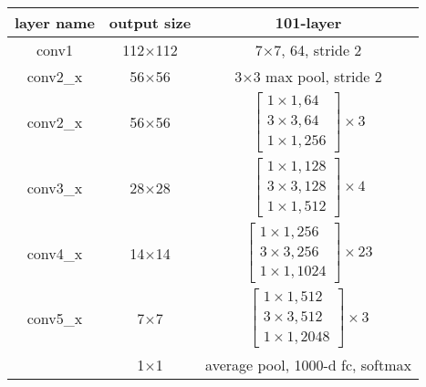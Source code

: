 \begin{itemize}
\begin{table}[!htbp]
\begin{tabular}{c|c|c|c|c}
         layer name& output size &\multicolumn{3}{c}{101-layer} \\
        \hline
         conv1 & 112$\times$112 & \multicolumn{3}{c}{7$\times$7, 64, stride 2}\\
         \hline
         conv2\_x & 56$\times$56 & \multicolumn{3}{c}{3$\times$3 max pool, stride 2} \\
         \hline
         conv2\_x & 56$\times$56 & \multicolumn{3}{c}{$\left[ \begin{array}{c}{1 \times 1,64} \\ {3 \times 3,64} \\ {1 \times 1,256}\end{array}\right] \times 3$}\\    
         \hline
        conv3\_x & 28$\times$28 & \multicolumn{3}{c}{$\left[ \begin{array}{c}{1 \times 1,128} \\ {3 \times 3,128} \\ {1 \times 1,512}\end{array}\right] \times 4$}\\
        \hline
        conv4\_x & 14$\times$14 & \multicolumn{3}{c}{$\left[ \begin{array}{c}{1 \times 1,256} \\ {3 \times 3,256} \\ {1 \times 1,1024}\end{array}\right] \times 23$}\\
        \hline
        conv5\_x & 7$\times$7 & \multicolumn{3}{c}{$\left[ \begin{array}{c}{1 \times 1,512} \\ {3 \times 3,512} \\ {1 \times 1,2048}\end{array}\right] \times 3$}\\
        \hline
        & 1$\times$1 &\multicolumn{3}{c}{average pool, 1000-d fc, softmax} \\
        \hline
    \end{tabular}
\end{table}

\begin{comment}
\begin{table}[!htbp]
    \bicaption{Resnet101参数配置\cite{8he2016deep}}{The config of Resnet101\cite{8he2016deep}}
    \label{tab:stage2_resmodel}
    \centering
    \footnotesize%
    \setlength{\tabcolsep}{4pt}%
    \begin{tabular}{c|c|c|c|c}
        \hline
        

\end{comment}
\end{itemize}
